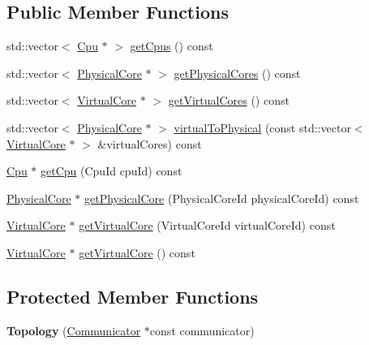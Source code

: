 \subsection*{Public Member Functions}
\begin{DoxyCompactItemize}
\item 
std\-::vector$<$ \hyperlink{classmammut_1_1topology_1_1Cpu}{Cpu} $\ast$ $>$ \hyperlink{classmammut_1_1topology_1_1Topology_a0d8f2dd0428b2c30a64a008c5777dd96}{get\-Cpus} () const 
\item 
std\-::vector$<$ \hyperlink{classmammut_1_1topology_1_1PhysicalCore}{Physical\-Core} $\ast$ $>$ \hyperlink{classmammut_1_1topology_1_1Topology_a8f528c95ea55e683d8bd1eaeed4b8608}{get\-Physical\-Cores} () const 
\item 
std\-::vector$<$ \hyperlink{classmammut_1_1topology_1_1VirtualCore}{Virtual\-Core} $\ast$ $>$ \hyperlink{classmammut_1_1topology_1_1Topology_a0f817a82c8fc5e8b08fd4f3d71977ea7}{get\-Virtual\-Cores} () const 
\item 
std\-::vector$<$ \hyperlink{classmammut_1_1topology_1_1PhysicalCore}{Physical\-Core} $\ast$ $>$ \hyperlink{classmammut_1_1topology_1_1Topology_a25f78963a2863893f30651fe61c61a84}{virtual\-To\-Physical} (const std\-::vector$<$ \hyperlink{classmammut_1_1topology_1_1VirtualCore}{Virtual\-Core} $\ast$ $>$ \&virtual\-Cores) const 
\item 
\hyperlink{classmammut_1_1topology_1_1Cpu}{Cpu} $\ast$ \hyperlink{classmammut_1_1topology_1_1Topology_adfecbf688e47e6b93dc603c85aa31cc9}{get\-Cpu} (Cpu\-Id cpu\-Id) const 
\item 
\hyperlink{classmammut_1_1topology_1_1PhysicalCore}{Physical\-Core} $\ast$ \hyperlink{classmammut_1_1topology_1_1Topology_a02e1dd7bb1785ca885778f4a2d2c4509}{get\-Physical\-Core} (Physical\-Core\-Id physical\-Core\-Id) const 
\item 
\hyperlink{classmammut_1_1topology_1_1VirtualCore}{Virtual\-Core} $\ast$ \hyperlink{classmammut_1_1topology_1_1Topology_a7b4676869aac232ba78881277bd0b395}{get\-Virtual\-Core} (Virtual\-Core\-Id virtual\-Core\-Id) const 
\item 
\hyperlink{classmammut_1_1topology_1_1VirtualCore}{Virtual\-Core} $\ast$ \hyperlink{classmammut_1_1topology_1_1Topology_a997bd6561163506c22b19ed4b3934ffc}{get\-Virtual\-Core} () const 
\end{DoxyCompactItemize}
\subsection*{Protected Member Functions}
\begin{DoxyCompactItemize}
\item 
\hypertarget{classmammut_1_1topology_1_1Topology_aadbbf4d1100af0b20ab44567c718b985}{{\bfseries Topology} (\hyperlink{classmammut_1_1Communicator}{Communicator} $\ast$const communicator)}\label{classmammut_1_1topology_1_1Topology_aadbbf4d1100af0b20ab44567c718b985}

\end{DoxyCompactItemize}
